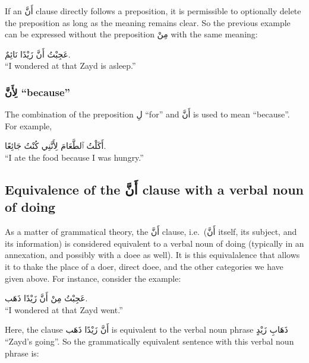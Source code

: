 \documentclass[
  10pt,
]{book}
\begin{document}
If an
\foreignlanguage{arabic}{أَنَّ} clause
directly follows a preposition, it is permissible to optionally delete the preposition as long as the meaning remains clear.
So the previous example can be expressed without the preposition \foreignlanguage{arabic}{مِنْ} with the same meaning:

\foreignlanguage{arabic}{عَجِبْتُ أَنَّ زَيْدًا نَائِمٌ.}\\
\enquote{I wondered at that Zayd is asleep.}

\subsubsection{\texorpdfstring{\foreignlanguage{arabic}{لِأَنَّ} \enquote{because}}{لِأَنَّ ``because''}}\label{ux644ux623ux646-because}

The combination of the preposition \foreignlanguage{arabic}{لِ} \enquote{for} and \foreignlanguage{arabic}{أَنَّ} is used to mean \enquote{because}. For example,

\foreignlanguage{arabic}{أَکَلْتُ ٱلطَّعَامَ لِأَنَّنِي کُنْتُ جَائِعًا.}\\
\enquote{I ate the food because I was hungry.}

\subsection{\texorpdfstring{Equivalence of the \foreignlanguage{arabic}{أَنَّ} clause with a verbal noun of doing}{Equivalence of the أَنَّ clause with a verbal noun of doing}}\label{equivalence-of-the-ux623ux646-clause-with-a-verbal-noun-of-doing}

As a matter of grammatical theory, the
\foreignlanguage{arabic}{أَنَّ} clause, i.e.~(\foreignlanguage{arabic}{أَنَّ} itself, its subject, and its information) is considered equivalent to a verbal noun of doing (typically in an annexation, and possibly with a doee as well). It is this equivalalence that allows it to thake the place of a doer, direct doee, and the other categories we have given above.
For instance, consider the example:

\foreignlanguage{arabic}{عَجِبْتُ مِنْ أَنَّ زَيْدًا ذَهَب.}\\
\enquote{I wondered at that Zayd went.}

Here, the clause
\foreignlanguage{arabic}{أَنَّ زَيْدًا ذَهَب}
is equivalent to the verbal noun phrase \foreignlanguage{arabic}{ذَهَابِ زَيْدٍ} \enquote{Zayd's going}. So the grammatically equivalent sentence with this verbal noun phrase is:
\end{document}
